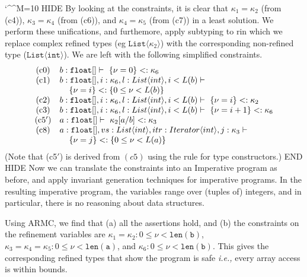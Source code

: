 \documentclass[nocopyrightspace]{sigplanconf}
\makeatletter
\def\set#1{{\{ #1\}}}
\def\tuple#1{{\langle #1 \rangle}}
\newcommand{\ie}{\textit{i.e.,}\xspace}
\newcommand{\ttb}{\mathtt{b}}
\newcommand{\tta}{\mathtt{a}}
\newcommand{\ttList}{\mathtt{List}}
\newcommand{\ttlena}{{\ttlen}\xspace}
\def\@comment{\let\do\@makeother \dospecials\catcode`\^^M=10\def\par{}}
\def\begincomment{\@comment\@xcomment}
\newenvironment{comment}{\begincomment}{}
\newcommand{\htab}{\hspace{0.4cm}}
\def\subt{<:}
\def\valu{\nu}
\newcommand{\ttfarray}{\xspace \mathtt{float[]}}
\newcommand{\kvar}{\kappa}
\def\ttint{\mathtt{int}}
\newcommand{\deriv}{\vdash\ }
\newcommand{\ttlen}{\mathtt{len}}
\def\IMPSEM{{Imperative}\xspace}
\makeatother
\begin{document}
\begin{comment}
HIDE By looking at the constraints, it is clear that $\kvar_1 = \kvar_2$ (from (c4)),
$\kvar_3 = \kvar_4$ (from (c6)), and $\kvar_4 = \kvar_5$ (from (c7)) in a least
solution. We perform these unifications, and furthemore, apply subtyping 
to rin which we replace complex refined types (eg $\ttList\tuple{\kvar_2}$)
with the corresponding non-refined type ($\ttList\tuple{\ttint}$).
We are left with the following simplified constraints.
\[
\begin{array}{cl}
	\mbox{(c0)} & b:\ttfarray \deriv \set{\valu=0} \subt \kvar_6\\
	\mbox{(c1)} & b:\ttfarray, i:\kvar_6, l:List\tuple{int}, i < L(b) \deriv \\
                    & \htab \set{\valu=i} \subt \set{0 \leq \valu < L(b)}\\
	\mbox{(c2)} & b:\ttfarray, i:\kvar_6, l:List\tuple{int}, i < L(b) \deriv \set{\valu=i} \subt \kvar_2\\
	\mbox{(c3)} & b:\ttfarray, i:\kvar_6, l:List\tuple{int}, i < L(b) \deriv \set{\valu=i+1} \subt \kvar_6\\
	\mbox{(c5$'$)} &   a:\ttfarray \deriv \kvar_2[a/b] \subt \kvar_3\\
	\mbox{(c8)} &    a:\ttfarray, vs:List\tuple{int}, itr:Iterator\tuple{int}, j:\kvar_3 \deriv \\
                    & \htab \set{\valu=j} \subt \set{0 \leq \valu < L(a)}
\end{array}
\]
(Note that (c5$'$) is derived from $(c5)$ using the rule for type constructors.)
END HIDE Now we can translate the constraints into an \IMPSEM program 
as before, and apply invariant generation
techniques for imperative programs.
In the resulting imperative program, the variables range over (tuples of) integers,
and in particular, there is no reasoning about data structures. 

Using ARMC, we find that (a) all the assertions hold, and (b) the constraints on the refinement
variables are 
$\kvar_1 =\kvar_2: 0\leq \valu < \ttlena(\ttb)$, 
$\kvar_3 = \kvar_4 = \kvar_5: 0\leq \valu < \ttlena(\tta)$, and
$\kvar_6: 0\leq \valu < \ttlena(\ttb)$.
This gives the corresponding refined types that 
show the program is safe \ie every array access is within bounds.

\end{comment}
\end{document}
